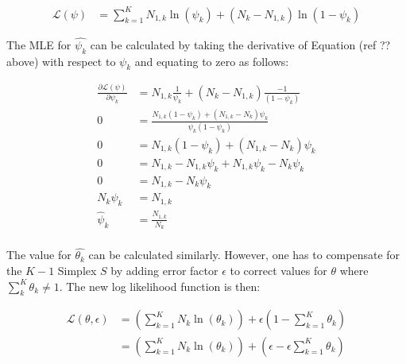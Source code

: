 \begin{equation}
    \begin{split}
        \mathcal{L}(\psi) &=  \sum_{k=1}^{K} N_{1,k} \ln \left( \psi_{k} \right) + \left( N_{k} - N_{1,k} \right) \ln \left( 1 - \psi_{k} \right)
    \end{split}
\end{equation}

The MLE for $\hat{\psi_{k}} $ can be calculated by taking the derivative of Equation (ref ?? above) with respect to $\psi_{k}$ and equating to zero as follows:

\begin{equation}
    \begin{split}
        \frac{\partial \mathcal{L}(\psi)}{\partial \psi_{k}} &= N_{1,k} \frac{1}{ \psi_{k}} + \left( N_{k} - N_{1,k} \right) \frac{-1}{ \left( 1 - \psi_{k} \right) } \\
        0 &=  \frac{ N_{1,k} \left( 1 - \psi_{k} \right) +  \left( N_{1,k} - N_{k} \right) \psi_{k}}{ \psi_{k} \left( 1 - \psi_{k} \right) } \\
        0 &=  N_{1,k} \left( 1 - \psi_{k} \right) +  \left( N_{1,k} - N_{k} \right) \psi_{k} \\
        0 &=  N_{1,k} - N_{1,k} \psi_{k}  +  N_{1,k} \psi_{k} - N_{k}\psi_{k} \\
        0 &=  N_{1,k} - N_{k}\psi_{k} \\
        N_{k}\psi_{k} &=  N_{1,k} \\
        \hat{\psi}_{k} &=  \frac{N_{1,k}}{N_{k}} \\
    \end{split}
\end{equation}


The value for $\hat{\theta_{k}} $ can be calculated similarly. However, one has to compensate for the $K-1$ Simplex $S$ by adding error factor $\epsilon$ to correct values for  $\theta$ where $\sum_{k}^{K} \theta_{k} \neq 1$. The new log likelihood function is then:

\begin{equation}
    \begin{split}
        \mathcal{L}(\theta, \epsilon)
        &=  \left( \sum_{k=1}^{K} N_{k} \ln \left( \theta_{k} \right) \right) + \epsilon \left( 1 - \sum_{k=1}^{K} \theta_{k} \right) \\
        &=  \left( \sum_{k=1}^{K} N_{k} \ln \left( \theta_{k} \right) \right) + \left( \epsilon -  \epsilon \sum_{k=1}^{K} \theta_{k} \right)
    \end{split}
\end{equation}

